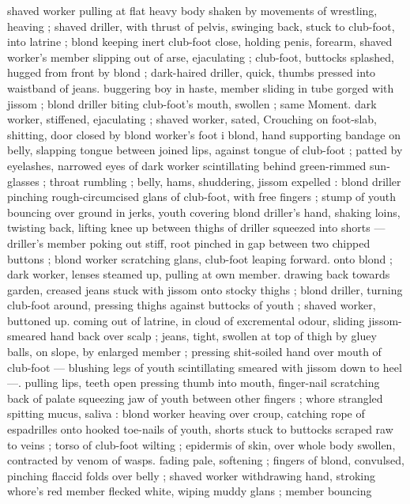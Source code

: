shaved worker pulling at flat heavy body shaken by movements of 
wrestling, heaving ; shaved driller, with thrust of pelvis, swinging 
back, stuck to club-foot, into latrine ; blond keeping inert club-foot 
close, holding penis, forearm, shaved worker's member slipping out 
of arse, ejaculating ; club-foot, buttocks splashed, hugged from front 
by blond ; dark-haired driller, quick, thumbs pressed into waistband 
of jeans. buggering boy in haste, member sliding in tube gorged with 
jissom ; blond driller biting club-foot's mouth, swollen ; same 
Moment. dark worker, stiffened, ejaculating ; shaved worker, sated, 
Crouching on foot-slab, shitting, door closed by blond worker's foot 
i blond, hand supporting bandage on belly, slapping tongue between 
joined lips, against tongue of club-foot ; patted by eyelashes, 
narrowed eyes of dark worker scintillating behind green-rimmed sun- 
glasses ; throat rumbling ; belly, hams, shuddering, jissom expelled : 
blond driller pinching rough-circumcised glans of club-foot, with free 
fingers ; stump of youth bouncing over ground in jerks, youth 
covering blond driller's hand, shaking loins, twisting back, lifting 
knee up between thighs of driller squeezed into shorts --- driller's 
member poking out stiff, root pinched in gap between two chipped 
buttons ; blond worker scratching glans, club-foot leaping forward. 
onto blond ; dark worker, lenses steamed up, pulling at own member. 
drawing back towards garden, creased jeans stuck with jissom onto 
stocky thighs ; blond driller, turning club-foot around, pressing 
thighs against buttocks of youth ; shaved worker, buttoned up. 
coming out of latrine, in cloud of excremental odour, sliding jissom- 
smeared hand back over scalp ; jeans, tight, swollen at top of thigh 
by gluey balls, on slope, by enlarged member ; pressing shit-soiled 
hand over mouth of club-foot --- blushing legs of youth scintillating 
smeared with jissom down to heel ---. pulling lips, teeth open 
pressing thumb into mouth, finger-nail scratching back of palate 
squeezing jaw of youth between other fingers ; whore strangled 
spitting mucus, saliva : blond worker heaving over croup, catching 
rope of espadrilles onto hooked toe-nails of youth, shorts stuck to 
buttocks scraped raw to veins ; torso of club-foot wilting ; epidermis 
of skin, over whole body swollen, contracted by venom of wasps. 
fading pale, softening ; fingers of blond, convulsed, pinching flaccid 
folds over belly ; shaved worker withdrawing hand, stroking whore's 
red member flecked white, wiping muddy glans ; member bouncing 
